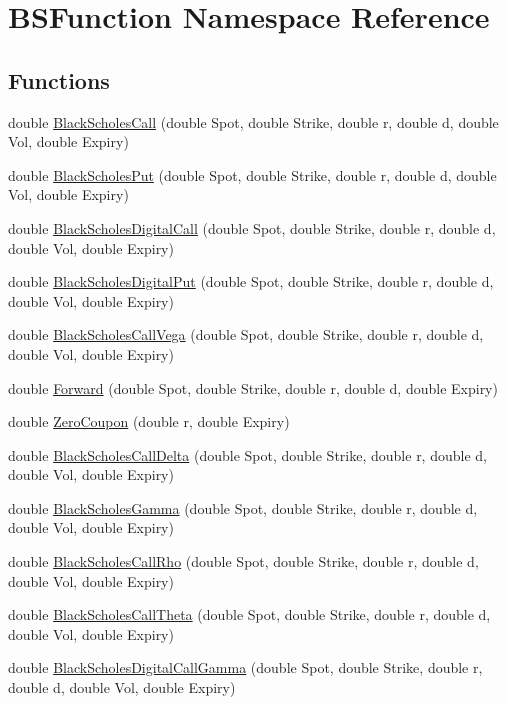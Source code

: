 \hypertarget{namespaceBSFunction}{}\section{B\+S\+Function Namespace Reference}
\label{namespaceBSFunction}
\subsection*{Functions}
\begin{DoxyCompactItemize}
\item 
double \hyperlink{namespaceBSFunction_aa60a1ed497dc546c36602310f828cf6d}{Black\+Scholes\+Call} (double Spot, double Strike, double r, double d, double Vol, double Expiry)
\item 
double \hyperlink{namespaceBSFunction_a363017016ff6d3746da2a672f985f253}{Black\+Scholes\+Put} (double Spot, double Strike, double r, double d, double Vol, double Expiry)
\item 
double \hyperlink{namespaceBSFunction_aefcfdd0b3724f9cd25fe48d5416992cc}{Black\+Scholes\+Digital\+Call} (double Spot, double Strike, double r, double d, double Vol, double Expiry)
\item 
double \hyperlink{namespaceBSFunction_a336cdef40f9b9416b156dd6561a30733}{Black\+Scholes\+Digital\+Put} (double Spot, double Strike, double r, double d, double Vol, double Expiry)
\item 
double \hyperlink{namespaceBSFunction_a12a711cab3ec1d88ac6e59d9538718ca}{Black\+Scholes\+Call\+Vega} (double Spot, double Strike, double r, double d, double Vol, double Expiry)
\item 
double \hyperlink{namespaceBSFunction_a39b0cb6fa3b178c43df8ffdf4da4e2e3}{Forward} (double Spot, double Strike, double r, double d, double Expiry)
\item 
double \hyperlink{namespaceBSFunction_a8e791280a07aa4c369588c8869127da3}{Zero\+Coupon} (double r, double Expiry)
\item 
double \hyperlink{namespaceBSFunction_a05c41b06001667e14920f12ce67278f0}{Black\+Scholes\+Call\+Delta} (double Spot, double Strike, double r, double d, double Vol, double Expiry)
\item 
double \hyperlink{namespaceBSFunction_a9bdd662c36e0aea60fc9a2fea306a777}{Black\+Scholes\+Gamma} (double Spot, double Strike, double r, double d, double Vol, double Expiry)
\item 
double \hyperlink{namespaceBSFunction_a3cfae33fb39077bd583237ad5687184a}{Black\+Scholes\+Call\+Rho} (double Spot, double Strike, double r, double d, double Vol, double Expiry)
\item 
double \hyperlink{namespaceBSFunction_a41430f735c335bd049ccfb8ad0cab08d}{Black\+Scholes\+Call\+Theta} (double Spot, double Strike, double r, double d, double Vol, double Expiry)
\item 
double \hyperlink{namespaceBSFunction_a27c85b93fb29693d68550920a366aa91}{Black\+Scholes\+Digital\+Call\+Gamma} (double Spot, double Strike, double r, double d, double Vol, double Expiry)
\end{DoxyCompactItemize}


